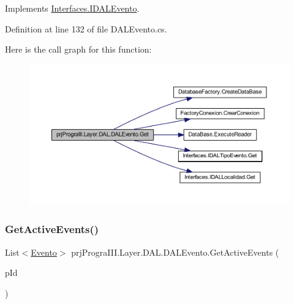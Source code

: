 Implements \hyperlink{interface_interfaces_1_1_i_d_a_l_evento_a2a6665c82b5721edc25723109e1add77}{Interfaces.\+I\+D\+A\+L\+Evento}.



Definition at line 132 of file D\+A\+L\+Evento.\+cs.

Here is the call graph for this function\+:
\nopagebreak
\begin{figure}[H]
\begin{center}
\leavevmode
\includegraphics[width=350pt]{classprj_progra_i_i_i_1_1_layer_1_1_d_a_l_1_1_d_a_l_evento_aaaa8b7f305fa6367d39bc53308d96aec_cgraph}
\end{center}
\end{figure}
\hypertarget{classprj_progra_i_i_i_1_1_layer_1_1_d_a_l_1_1_d_a_l_evento_ad6d492b77a450533f979d1a67993fb17}{}\label{classprj_progra_i_i_i_1_1_layer_1_1_d_a_l_1_1_d_a_l_evento_ad6d492b77a450533f979d1a67993fb17} 
\subsubsection{\texorpdfstring{Get\+Active\+Events()}{GetActiveEvents()}}
{\footnotesize\ttfamily List$<$\hyperlink{classprj_progra_i_i_i_1_1_layer_1_1_entities_1_1_evento}{Evento}$>$ prj\+Progra\+I\+I\+I.\+Layer.\+D\+A\+L.\+D\+A\+L\+Evento.\+Get\+Active\+Events (\begin{DoxyParamCaption}\item[{Date\+Time}]{p\+Id }\end{DoxyParamCaption})}



